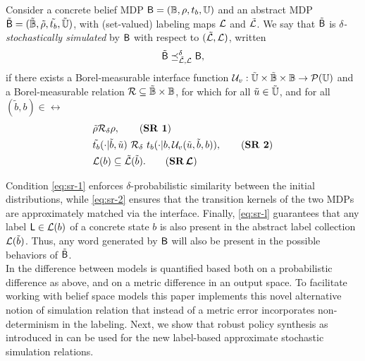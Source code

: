 \documentclass{ifacconf}
\begin{document}
\begin{definition}
\label{def:apbsim}
Consider a concrete belief MDP $\mathsf{B} = (\mathbb{B}, \rho, t_b, {\mathbb{U}})$ and an abstract MDP $\tilde{\mathsf{B}} = (\tilde {\mathbb{B}}, \tilde \rho, \tilde {t_b}, \tilde {{\mathbb{U}}})$, with (set-valued) labeling maps $\mathcal{L}$ and  $\tilde{\mathcal{L}}$. We say that	$\tilde {\mathsf{B}}$ is \emph{$\delta$-stochastically simulated} by $ \mathsf{B}$ with respect to $(\tilde{\mathcal{L}},\mathcal{L})$, written
\begin{equation}
 \tilde {\mathsf{B}}\preceq^{\delta}_{\tilde{\mathcal{L}},\mathcal{L}}  \mathsf{B},
\end{equation}
if there exists a Borel-measurable interface function $\mathcal{U}_{v} : \tilde {{\mathbb{U}}} \times \tilde {\mathbb{B}} \times \mathbb{B} \rightarrow \mathcal P({\mathbb{U}})$ and a Borel-measurable relation $\mathcal{R}\subseteq \tilde {\mathbb{B}}\times \mathbb{B}$, for which for all  $ \tilde u\in \tilde {{\mathbb{U}}}$, and for all $ (\tilde b,b)\in \rel$
\begin{align}
  \label{eq:sr-1} & \tilde\init \bar \rel_\delta \init, \tag{\textbf{SR 1}} \\
  \label{eq:sr-2} &  \tilde \trb(\cdot| \tilde b, \tilde u)\ \bar \rel_\delta \  \trb(\cdot| b, \InF(\tilde u,\tilde b,b)), \tag{\textbf{SR 2}} \\
  \label{eq:sr-l} & %
   \Labset(b)\subseteq \tilde{\Labset}(\tilde b).\tag{\textbf{SR$\,\boldsymbol{\CA{L}}$}}
\end{align}

\end{definition}

Condition \eqref{eq:sr-1} enforces $\delta$-probabilistic similarity between the initial distributions, while \eqref{eq:sr-2} ensures that the transition kernels of the two MDPs are approximately matched via the interface. Finally, \eqref{eq:sr-l} guarantees that any label $\mathsf{L} \in \mathcal{L}(b)$ of a concrete state $b$ is also present in the abstract label collection $\mathcal{L}(\tilde b)$. Thus, any word generated by $\mathsf{B}$ will also be present in the possible behaviors of $\tilde {\mathsf{B}}$.
\\
In \citet{haesaert2017verification} the difference between models is quantified based both on a probabilistic difference as above, and on a metric difference in an output space. To facilitate working with belief space models this paper implements this novel alternative notion of simulation relation that instead of a metric error incorporates non-determinism in the labeling.
Next, we show that robust policy synthesis as introduced in \cite{tech_report_TACAS} can be used for the new label-based approximate stochastic simulation relations.
\end{document}
